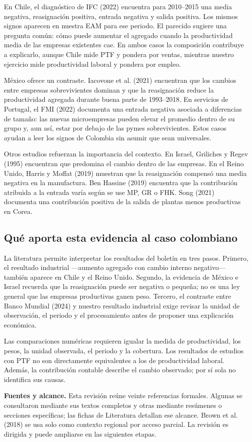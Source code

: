 En Chile, el diagnóstico de IFC (2022) encuentra para 2010--2015 una media negativa, reasignación positiva, entrada negativa y salida positiva. Los mismos signos aparecen en nuestra EAM para ese periodo. El parecido sugiere una pregunta común: cómo puede aumentar el agregado cuando la productividad media de las empresas existentes cae. En ambos casos la composición contribuye a explicarlo, aunque Chile mide PTF y pondera por ventas, mientras nuestro ejercicio mide productividad laboral y pondera por empleo.

México ofrece un contraste. Iacovone et al. (2021) encuentran que los cambios entre empresas sobrevivientes dominan y que la reasignación reduce la productividad agregada durante buena parte de 1993--2018. En servicios de Portugal, el FMI (2022) documenta una entrada negativa asociada a diferencias de tamaño: las nuevas microempresas pueden elevar el promedio dentro de su grupo y, aun así, estar por debajo de las pymes sobrevivientes. Estos casos ayudan a leer los signos de Colombia sin asumir que sean universales.

Otros estudios refuerzan la importancia del contexto. En Israel, Griliches y Regev (1995) encuentran que predomina el cambio dentro de las empresas. En el Reino Unido, Harris y Moffat (2019) muestran que la reasignación compensó una media negativa en la manufactura. Ben Hassine (2019) encuentra que la contribución atribuida a la entrada varía según se use MP, GR o FHK. Song (2021) documenta una contribución positiva de la salida de plantas menos productivas en Corea.

\subsection{Qué aporta esta evidencia al caso colombiano}
La literatura permite interpretar los resultados del boletín en tres pasos. Primero, el resultado industrial —aumento agregado con cambio interno negativo— también aparece en Chile y el Reino Unido. Segundo, la evidencia de México e Israel recuerda que la reasignación puede ser negativa o pequeña; no es una ley general que las empresas productivas ganen peso. Tercero, el contraste entre Banco Mundial (2024) y nuestro resultado industrial exige revisar la unidad de observación, el periodo y el procesamiento antes de proponer una explicación económica.

Las comparaciones numéricas requieren igualar la medida de productividad, los pesos, la unidad observada, el periodo y la cobertura. Los resultados de estudios con PTF no son directamente equivalentes a los de productividad laboral. Además, la contribución contable describe el cambio observado; por sí sola no identifica sus causas.

\textbf{Fuentes y alcance.} Esta revisión reúne veinte referencias formales. Algunas se consultaron mediante sus textos completos y otras mediante resúmenes o secciones específicas; las fichas de Literatura detallan ese alcance. Brown et al. (2018) se usa solo como contexto regional por acceso parcial. La revisión es dirigida y puede ampliarse en las siguientes etapas.
\clearpage
